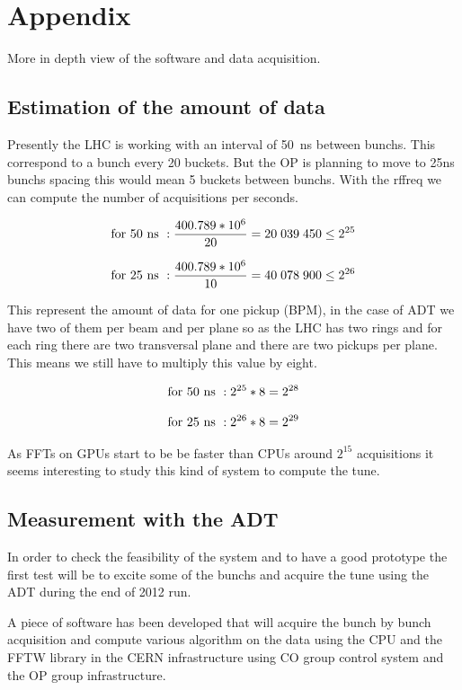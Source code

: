 %

\chapter{Appendix}

More in depth view of the software and data acquisition.

\section{Estimation of the amount of data}

Presently the \gls{LHC} is working with an interval of 50~ns between \glspl{bunch}. This correspond to a bunch every 20 \glspl{bucket}. But the \gls{OP} is planning to move to 25ns \glspl{bunch} spacing this would mean 5 \glspl{bucket} between \glspl{bunch}. With the \gls{rffreq} we can compute the number of acquisitions per seconds.

$${\rm for~}50{\rm ~ns}~: \frac{400.789*10^{6}}{20} = 20\;039\;450 \leq 2^{25}$$

$${\rm for~}25{\rm ~ns}~: \frac{400.789*10^{6}}{10} = 40\;078\;900 \leq 2^{26}$$ 

This represent the amount of data for one pickup (\gls{BPM}), in the case of \gls{ADT} we have two of them per beam and per plane so as the \gls{LHC} has two rings and for each ring there are two transversal plane and there are two pickups per plane. This means we still have to multiply this value by eight.

$${\rm for~}50{\rm ~ns}~: 2^{25} * 8 = 2^{28}$$

$${\rm for~}25{\rm ~ns}~: 2^{26} * 8 = 2^{29}$$

As \glspl{FFT} on \glspl{GPU} start to be be faster than \glspl{CPU} around $2^{15}$ acquisitions it seems interesting to study this kind of system to compute the \gls{tune}.

\section{Measurement with the ADT}

In order to check the feasibility of the system and to have a good prototype the first test will be to excite some of the \glspl{bunch} and acquire the \gls{tune} using the \gls{ADT} during the end of 2012 run\cite{Valuch12}.

A piece of software has been developed that will acquire the bunch by bunch acquisition and compute various algorithm on the data using the \gls{CPU} and the \gls{FFTW} library in the \gls{CERN} infrastructure using \gls{CO} group control system and the \gls{OP} group infrastructure.

